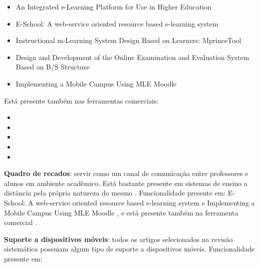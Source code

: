 \vspace{-5mm}
\begin{itemize}
    \item An Integrated e-Learning Platform for Use in Higher Education \cite{florea_integrated_2011}
    \item E-School: A web-service oriented resource based e-learning system \cite{sultana_e-school:_2010}
    \item Instructional m-Learning System Design Based on Learners: MprinceTool \cite{fardoun_instructional_2010}
    \item Design and Development of the Online Examination and Evaluation System Based on B/S Structure \cite{li_design_2007}
    \item Implementing a Mobile Campus Using MLE Moodle \cite{xhafa_implementing_2010}
\end{itemize}

\noindent
Está presente também nas ferramentas comerciais: 
\vspace{-5mm}
\begin{itemize}
    \item {}
    \item {}
    \item {}
    \item {}
    \item {}
\end{itemize}

\textbf{Quadro de recados}: servir como um canal de comunicação entre professores e alunos em ambiente acadêmico. Está bastante presente em sistemas de ensino a distância pela própria natureza do mesmo \cite{sultana_e-school:_2010}. Funcionalidade presente em: E-School: A web-service oriented resource based e-learning system \cite{sultana_e-school:_2010} e Implementing a Mobile Campus Using MLE Moodle \cite{xhafa_implementing_2010}, e está presente também na ferramenta comercial .

\textbf{Suporte a dispositivos móveis}: todos os artigos selecionados na revisão sistemática possuiam algum tipo de suporte a dispositivos móveis. Funcionalidade presente em: 

